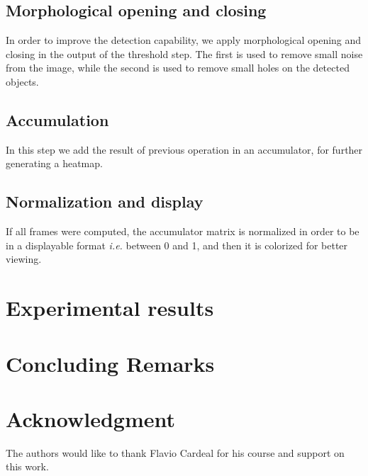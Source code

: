 \documentclass[10pt, conference]{IEEEtran}
\begin{document}
\subsection{Morphological opening and closing}
	In order to improve the detection capability, we apply morphological opening and closing\cite{haralick1987image} in the output of the threshold step. The first is used to remove small noise from the image, while the second is used to remove small holes on the detected objects.
\subsection{Accumulation}
	In this step we add the result of previous operation in an accumulator, for further generating a heatmap.
	
\subsection{Normalization and display}
	If all frames were computed, the accumulator matrix is normalized in order to be in a displayable format \textit{i.e.} between 0 and 1, and then it is colorized for better viewing.

\section{Experimental results}

\section{Concluding Remarks}

\section*{Acknowledgment}
The authors would like to thank Flavio Cardeal for his course and support on this work.




\end{document}
